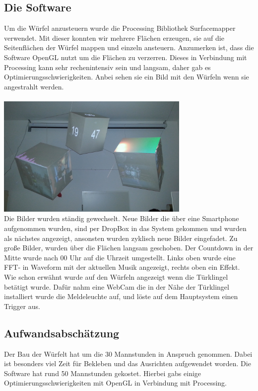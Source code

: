 \documentclass[pdftex,12pt,a4paper]{report}
\begin{document}
\subsection{Die Software}
Um die Würfel anzusteuern wurde die Processing Bibliothek Surfacemapper verwendet. Mit dieser konnten wir mehrere Flächen erzeugen, sie auf die Seitenflächen der Würfel mappen und einzeln ansteuern. Anzumerken ist, dass die Software OpenGL nutzt um die Flächen zu verzerren. Dieses in Verbindung mit Processing kann sehr rechenintensiv sein und langsam, daher gab es  Optimierungsschwierigkeiten. Anbei sehen sie ein Bild mit den Würfeln wenn sie angestrahlt werden.
\\ \\
\includegraphics[width=0.7\textwidth]{./wuerfel_angestrahlt}\\[1cm]   
Die Bilder wurden ständig gewechselt. Neue Bilder die über eine Smartphone aufgenommen wurden, sind per DropBox in das System gekommen und wurden als nächstes angezeigt, ansonsten wurden zyklisch neue Bilder eingefadet. Zu große Bilder, wurden über die Flächen langsam geschoben. 
Der Countdown in der Mitte wurde nach 00 Uhr auf die Uhrzeit umgestellt. Links oben wurde eine FFT- in Waveform mit der aktuellen Musik angezeigt, rechts oben ein Effekt.
Wie schon erwähnt wurde auf den Würfeln angezeigt wenn die Türklingel betätigt wurde. Dafür nahm eine WebCam die in der Nähe der Türklingel installiert wurde die Meldeleuchte auf, und löste auf dem Hauptsystem einen Trigger aus.

\newpage

\subsection{Aufwandsabschätzung}
Der Bau der Würfelt hat um die 30 Mannstunden in Anspruch genommen. Dabei ist besonders viel Zeit für Bekleben und das Ausrichten aufgewendet worden. Die Software hat rund 50 Mannstunden gekostet. Hierbei gabs einige Optimierungsschwierigkeiten mit OpenGL in Verbindung mit Processing.
\end{document}
